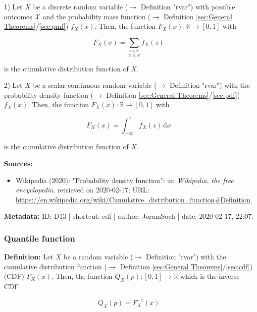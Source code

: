 \documentclass[a4paper,12pt]{book}
\begin{document}
1) Let $X$ be a discrete random variable ($\rightarrow$ Definition "rvar") with possible outcomes $\mathcal{X}$ and the probability mass function ($\rightarrow$ Definition \ref{sec:General Theorems}/\ref{sec:pmf}) $f_X(x)$. Then, the function $F_X(x): \mathbb{R} \to [0,1]$ with

\begin{equation} \label{eq:cdf-cdf-disc}
F_X(x) = \sum_{\overset{z \in \mathcal{X}}{z \leq x}} f_X(z)
\end{equation}

is the cumulative distribution function of $X$.

2) Let $X$ be a scalar continuous random variable ($\rightarrow$ Definition "rvar") with the probability density function ($\rightarrow$ Definition \ref{sec:General Theorems}/\ref{sec:pdf}) $f_X(x)$. Then, the function $F_X(x): \mathbb{R} \to [0,1]$ with

\begin{equation} \label{eq:cdf-cdf-cont}
F_X(x) = \int_{-\infty}^{x} f_X(z) \, \mathrm{d}x
\end{equation}

is the cumulative distribution function of $X$.

\vspace{1em}
\textbf{Sources:}
\begin{itemize}
\item Wikipedia (2020): "Probability density function"; in: \textit{Wikipedia, the free encyclopedia}, retrieved on 2020-02-17; URL: \url{https://en.wikipedia.org/wiki/Cumulative_distribution_function#Definition}.
\end{itemize}


\vspace{1em}
\textbf{Metadata:} ID: D13 | shortcut: cdf | author: JoramSoch | date: 2020-02-17, 22:07.


\subsubsection[\textit{Quantile function}]{Quantile function} \label{sec:qf}

\vspace{1em}
\textbf{Definition:} Let $X$ be a random variable ($\rightarrow$ Definition "rvar") with the cumulative distribution function ($\rightarrow$ Definition \ref{sec:General Theorems}/\ref{sec:cdf}) (CDF) $F_X(x)$. Then, the function $Q_X(p): [0,1] \to \mathbb{R}$ which is the inverse CDF

\begin{equation} \label{eq:qf-qf}
Q_X(p) = F_X^{-1}(x)
\end{equation}
\end{document}

